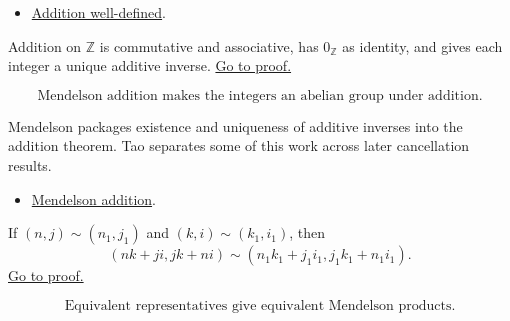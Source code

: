 \begin{dependencies}
\begin{itemize}
  \item \hyperref[lem:men-add-welld]{Addition well-defined}.
\end{itemize}
\end{dependencies}

\begin{theorem}
\label{thm:men-add}
Addition on \(\mathbb{Z}\) is commutative and associative, has
\(0_{\mathbb{Z}}\) as identity, and gives each integer a unique additive
inverse.
\hyperref[prf:men-add]{Go to proof.}
\end{theorem}

\begin{remark*}
\[
  \text{Mendelson addition makes the integers an abelian group under addition.}
\]
\end{remark*}

\begin{remark*}[Interpretation]
Mendelson packages existence and uniqueness of additive inverses into the
addition theorem. Tao separates some of this work across later cancellation
results.
\end{remark*}

\begin{dependencies}
\begin{itemize}
  \item \hyperref[def:men-addition]{Mendelson addition}.
\end{itemize}
\end{dependencies}

\begin{lemma}
\label{lem:men-mul-welld}
If \((n,j)\sim(n_1,j_1)\) and \((k,i)\sim(k_1,i_1)\), then
\[
  (nk+ji,jk+ni)\sim(n_1k_1+j_1i_1,j_1k_1+n_1i_1).
\]
\hyperref[prf:men-mul-welld]{Go to proof.}
\end{lemma}


\begin{remark*}
\[
  \text{Equivalent representatives give equivalent Mendelson products.}
\]
\end{remark*}


